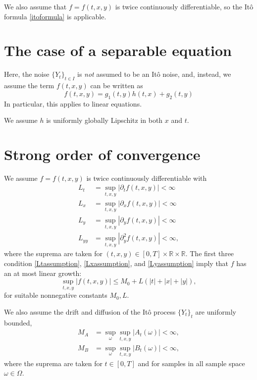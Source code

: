 \documentclass[reqno,12pt]{amsart}
\theoremstyle{plain}%
\theoremstyle{definition}
\begin{document}
We also assume that $f=f(t, x, y)$ is twice continuously differentiable, so the It\^o formula \eqref{itoformula} is applicable.

\section{The case of a separable equation}

Here, the noise $\{Y_t\}_{t\in I}$ is \emph{not} assumed to be an It\^o noise, and, instead, we assume the term $f(t, x, y)$ can be written as
$$
    f(t, x, y) = g_1(t, y)h(t, x) + g_2(t, y)
$$
In particular, this applies to linear equations.

We assume $h$ is uniformly globally Lipschitz in both $x$ and $t$.

\section{Strong order of convergence}

We assume $f=f(t, x, y)$ is twice continuously differentiable with
\begin{align}
  \label{Ltassumption} L_t & = \sup_{t, x, y} |\partial_t f(t, x, y)| < \infty \\
  \label{Lxassumption} L_x & = \sup_{t, x, y} |\partial_x f(t, x, y)| < \infty \\
  \label{Lyassumption} L_y & = \sup_{t, x, y} |\partial_y f(t, x, y)| < \infty \\
  \label{Lyyassumption} L_{yy} & = \sup_{t, x, y} |\partial_y^2 f(t, x, y)| < \infty,
\end{align}
where the suprema are taken for $(t, x, y) \in [0, T] \times \mathbb{R} \times \mathbb{R}$. The first three condition \eqref{Ltassumption}, \eqref{Lxassumption}, and \eqref{Lyassumption} imply that $f$ has an at most linear growth:
\begin{equation}
    \label{Mfassumption}
    \sup_{t, x, y} |f(t, x, y)| \leq M_0 + L(|t| + |x| + |y|),
\end{equation}
for suitable nonnegative constants $M_0, L$.

We also assume the drift and diffusion of the It\^o process $\{Y_t\}_t$ are uniformly bounded,
\begin{align}
  \label{MAassumption} M_A & = \sup_\omega \sup_{t, x, y} |A_t(\omega)| < \infty, \\
  \label{MBassumption} M_B & = \sup_\omega\sup_{t, x, y} |B_t(\omega)| < \infty,
\end{align}
where the suprema are taken for $t\in [0, T]$ and for samples in all sample space $\omega\in \Omega$.
\end{document}

